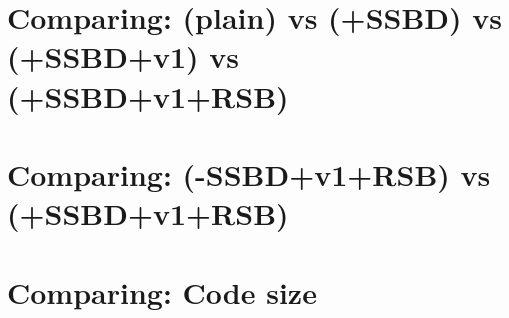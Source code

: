 \documentclass[10pt]{article}
\begin{document}
\tableofcontents

\clearpage
\section{ Comparing: (plain) vs (+SSBD) vs (+SSBD+v1) vs (+SSBD+v1+RSB) }
\newpage


\clearpage
\section{Comparing: (-SSBD+v1+RSB) vs (+SSBD+v1+RSB)}
\newpage


\clearpage
\section{Comparing: Code size}
\newpage

\end{document}
